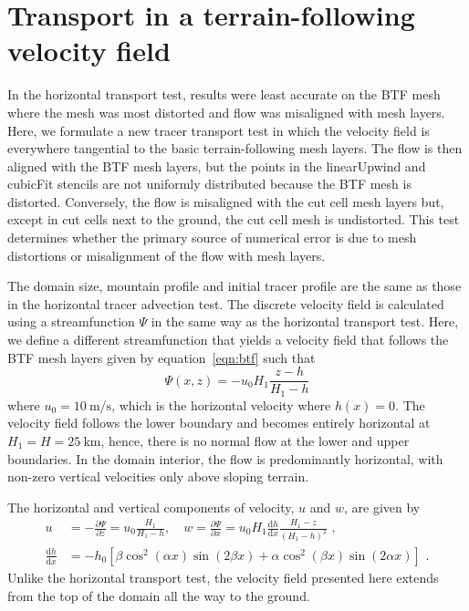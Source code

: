 \section{Transport in a terrain-following velocity field}

In the horizontal transport test, results were least accurate on the BTF mesh where the mesh was most distorted and flow was misaligned with mesh layers.
Here, we formulate a new tracer transport test in which the velocity field is everywhere tangential to the basic terrain-following mesh layers.
The flow is then aligned with the BTF mesh layers, but the points in the linearUpwind and cubicFit stencils are not uniformly distributed because the BTF mesh is distorted.
Conversely, the flow is misaligned with the cut cell mesh layers but, except in cut cells next to the ground, the cut cell mesh is undistorted.
This test determines whether the primary source of numerical error is due to mesh distortions or misalignment of the flow with mesh layers.

The domain size, mountain profile and initial tracer profile are the same as those in the horizontal tracer advection test.
The discrete velocity field is calculated using a streamfunction $\Psi$ in the same way as the horizontal transport test.
Here, we define a different streamfunction that yields a velocity field that follows the BTF mesh layers given by equation~\eqref{eqn:btf} such that
\begin{equation}
	\Psi(x,z) = -u_0 H_1 \frac{z - h}{H_1 - h} \label{eqn:streamfunc-btf}
\end{equation}
where $u_0 = \SI{10}{\meter\per\second}$, which is the horizontal velocity where $h(x) = 0$.
The velocity field follows the lower boundary and becomes entirely horizontal at $H_1 = H = \SI{25}{\kilo\meter}$, hence, there is no normal flow at the lower and upper boundaries.
In the domain interior, the flow is predominantly horizontal, with non-zero vertical velocities only above sloping terrain.

The horizontal and vertical components of velocity, $u$ and $w$, are given by
\begin{align}
	u &= -\frac{\partial \Psi}{\partial z} = u_0 \frac{H_1}{H_1 - h}, \quad w = \frac{\partial \Psi}{\partial x} = u_0 H_1 \frac{\mathrm{d} h}{\mathrm{d} x} \frac{H_1 - z}{\left( H_1 - h \right)^2} \label{eqn:slanted:uw-btf} \text{ ,}\\
	\frac{\mathrm{d} h}{\mathrm{d} x} &= - h_0 \left[ 
		\beta \cos^2 \left( \alpha x \right) \sin \left( 2 \beta x \right) +
		\alpha \cos^2 \left( \beta x \right) \sin \left( 2 \alpha x \right)
	\right] \text{ .}
\end{align}
Unlike the horizontal transport test, the velocity field presented here extends from the top of the domain all the way to the ground.

